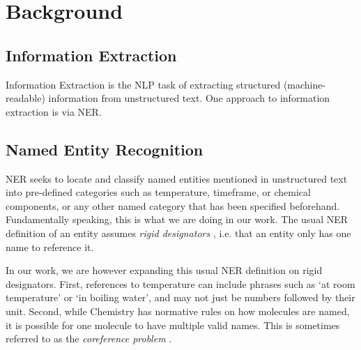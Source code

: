 \chapter{Background}\label{chap:background}


% 



\section{Information Extraction}\label{sec:extraction}
Information Extraction is the \gls{NLP} task of extracting structured (machine-readable) information from unstructured text.
One approach to information extraction is via \gls{NER}.

\section{Named Entity Recognition}\label{sec:NER}
\gls{NER} seeks to locate and classify named entities mentioned in unstructured text into pre-defined categories \cite{li_survey_2022} such as temperature, timeframe, or chemical components, or any other named category that has been specified beforehand.
Fundamentally speaking, this is what we are doing in our work.
The usual \gls{NER} definition of an entity assumes \textit{rigid designators} \cite{laporte_rigid_2022}, i.e. that an entity only has one name to reference it.

In our work, we are however expanding this usual \gls{NER} definition on rigid designators.
First, references to temperature can include phrases such as `at room temperature' or `in boiling water', and may not just be numbers followed by their unit.
Second, while Chemistry has normative rules on how molecules are named, it is possible for one molecule to have multiple valid names. This is sometimes referred to as the \textit{coreference problem} \cite{hobbs_coherence_1979}.

